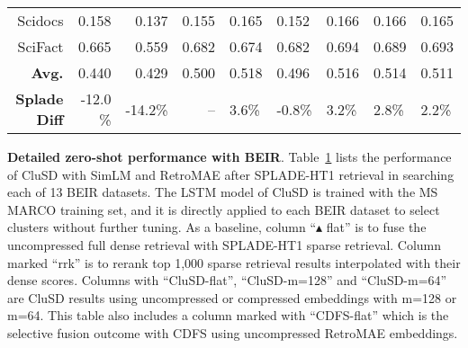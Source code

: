 {\begin{table}[h]
{\begin{tabular}{r r r r  |lllll}
                {Scidocs}	& 0.158 &0.137  &0.155 &	{0.165} &0.152&  0.166 & 0.166 & 0.165 \\
                {SciFact}	& 0.665 & 0.559  & {0.682} & 0.674 &0.682&  0.694 & 0.689 & 0.693 \\
                            \hline
                \textbf{Avg.} & 0.440 & 0.429  &0.500 & 0.518 &0.496&  0.516 & 0.514 & 0.511 \\
                \textbf{{Splade Diff}} & -12.0 \% &  -14.2\%  &-- & 3.6\% & -0.8\% &3.2\% & 2.8\% & 2.2\% \\
            \hline\hline
		\end{tabular}
		}
	
  \vspace*{-5mm}
	\label{tab:beir}

\end{table}

}


\textbf{ Detailed zero-shot performance with BEIR}.
\label{sect:evalbeir}
Table~\ref{tab:beir} lists  the performance of  CluSD  
with  SimLM and  RetroMAE after SPLADE-HT1 retrieval in searching each of 13 BEIR datasets.
The LSTM model of CluSD  is trained with the  MS MARCO training set,
and it is directly applied to each BEIR  dataset to select clusters without further tuning. 
As a baseline, column ``$\blacktriangle$ flat'' is to fuse  the uncompressed full dense retrieval  with SPLADE-HT1 sparse  retrieval.
Column marked ``rrk'' is to rerank   top 1,000  sparse retrieval results interpolated with their dense scores. 
Columns with ``CluSD-flat'', ``CluSD-m=128'' and ``CluSD-m=64''  are  CluSD results  using uncompressed or compressed embeddings with
m=128 or m=64. 
This table also includes a column marked with ``CDFS-flat'' which is  the  selective fusion outcome with CDFS using uncompressed RetroMAE embeddings. 


